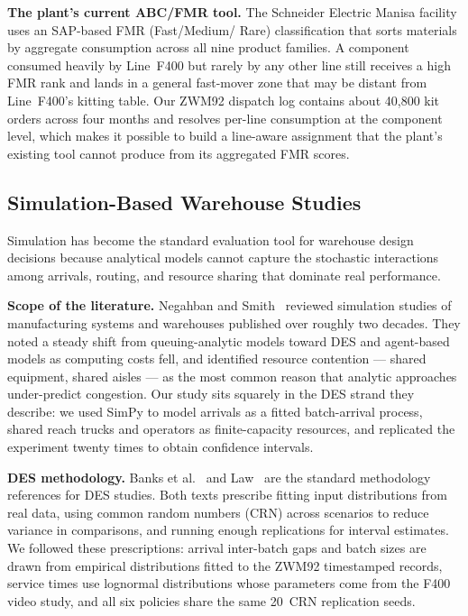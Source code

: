\medskip
\noindent\textbf{The plant's current ABC/FMR tool.}
The Schneider Electric Manisa facility uses an SAP-based FMR (Fast/Medium/
Rare) classification that sorts materials by aggregate consumption across
all nine product families.
A component consumed heavily by Line~F400 but rarely by any other line still
receives a high FMR rank and lands in a general fast-mover zone that may be
distant from Line~F400's kitting table.
Our ZWM92 dispatch log contains about 40,800 kit orders across four months
and resolves per-line consumption at the component level, which makes it
possible to build a line-aware assignment that the plant's existing tool
cannot produce from its aggregated FMR scores.

\subsection{Simulation-Based Warehouse Studies}\label{subsec:sim}

Simulation has become the standard evaluation tool for warehouse design
decisions because analytical models cannot capture the stochastic
interactions among arrivals, routing, and resource sharing that dominate
real performance.

\medskip
\noindent\textbf{Scope of the literature.}
Negahban and Smith~\cite{negahban2014} reviewed simulation studies of
manufacturing systems and warehouses published over roughly two decades.
They noted a steady shift from queuing-analytic models toward DES and
agent-based models as computing costs fell, and identified resource
contention — shared equipment, shared aisles — as the most common reason
that analytic approaches under-predict congestion.
Our study sits squarely in the DES strand they describe: we used SimPy to
model arrivals as a fitted batch-arrival process, shared reach trucks and
operators as finite-capacity resources, and replicated the experiment twenty
times to obtain confidence intervals.

\medskip
\noindent\textbf{DES methodology.}
Banks et al.~\cite{banks2010} and Law~\cite{law2015} are the standard
methodology references for DES studies.
Both texts prescribe fitting input distributions from real data, using
common random numbers (CRN) across scenarios to reduce variance in
comparisons, and running enough replications for interval estimates.
We followed these prescriptions: arrival inter-batch gaps and batch sizes
are drawn from empirical distributions fitted to the ZWM92 timestamped
records, service times use lognormal distributions whose parameters come
from the F400 video study, and all six policies share the same 20~CRN
replication seeds.

